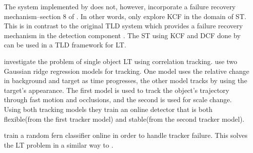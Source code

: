 The system implemented by \citeauthor{Enriques2014} does not, however, incorporate a failure recovery mechanism--section 8 of \cite{Enriques2014}.
In other words, \citeauthor{Enriques2014} only explore KCF in the domain of ST.
This is in contrast to the original TLD system which provides a failure recovery mechanism in the detection component \cite{Kalal2011}.
The ST using KCF and DCF done by \citeauthor{Enriques2014} can be used in a TLD framework for LT.

\citeauthor{Ma2015Correlation} \cite{Ma2015Correlation} investigate the problem of single object LT using correlation tracking.
\citeauthor{Ma2015Correlation} use two Gaussian ridge regression \cite{murphy2012} models for tracking.
One model uses the relative change in background and target as time progresses, the other model tracks by using the target's appearance.
The first model is used to track the object's trajectory through fast motion and occlusions, and the second is used for scale change.
Using both tracking models they train an online detector that is both flexible(from the first tracker model) and stable(from the second tracker model).

\citeauthor{Ma2015Correlation} train a random fern classifier \cite{ferns2007, Kalal2011} online in order to handle tracker failure.
This solves the LT problem in a similar way to \citeauthor{KalalPHD} \cite{KalalPHD}.
